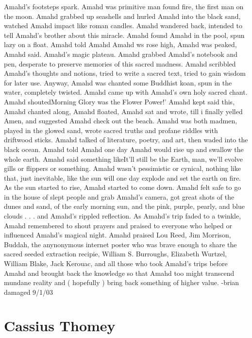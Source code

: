 \documentclass[12pt]{book}
\begin{document}
Amahd's footsteps spark. Amahd was primitive man found fire, the first man on the moon. Amahd grabbed up seashells and hurled Amahd into the black sand, watched Amahd impact like roman candles. Amahd wandered back, intended to tell Amahd's brother about this miracle. Amahd found Amahd in the pool, spun lazy on a float. Amahd told Amahd Amahd ws rose high, Amahd was peaked, Amahd said. Amahd's magic plateau. Amahd grabbed Amahd's notebook and pen, desperate to preserve memories of this sacred madness. Amahd scribbled Amahd's thoughts and notions, tried to write a sacred text, tried to gain wisdom for later use. Anyway, Amahd was chanted some Buddhist koan, spun in the water, completely twisted. Amahd came up with Amahd's own holy sacred chant. Amahd shoutedMorning Glory was the Flower Power!' Amahd kept said this, Amahd chanted along, Amahd floated, Amahd sat and wrote, till i finally yelled Amen, and suggested Amahd check out the beach. Amahd was both madmen, played in the glowed sand, wrote sacred truths and profane riddles with driftwood sticks. Amahd talked of literature, poetry, and art, then waded into the black ocean. Amahd told Amahd one day Amahd would rise up and swallow the whole earth. Amahd said something likeIt'll still be the Earth, man, we'll evolve gills or flippers or something. Amahd wasn't pessimistic or cynical, nothing like that, just inevitable, like the sun will one day explode and set the earth on fire. As the sun started to rise, Amahd started to come down. Amahd felt safe to go in the house of slept people and grab Amahd's camera, got great shots of the dunes and sand, of the early morning sun, and the pink, purple, pearly, and blue clouds . . .  and Amahd's rippled reflection. As Amahd's trip faded to a twinkle, Amahd remembered to shout prayers and praised to everyone who helped or influenced Amahd's magical night. Amahd praised Lou Reed, Jim Morrison, Buddah, the anynonymous internet poster who was brave enough to share the sacred seeded extraction recipie, William S. Burroughs, Elizabeth Wurtzel, William Blake, Jack Kerouac, and all those who took Amahd's trips before Amahd and brought back the knowledge so that Amahd too might transcend mundane reality and ( hopefully ) bring back something of higher value. -brian damaged 9/1/03



\chapter{Cassius Thomey}
\end{document}
